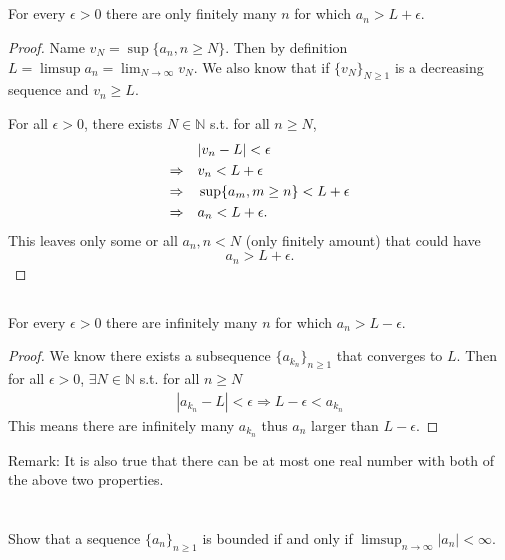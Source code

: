 \documentclass[11pt,letterpaper]{article}
\begin{document}
\subsection{} \label{sec:4a}
For every $\epsilon > 0$ there are only finitely many $n$ for which $a_n>L+\epsilon$.

\begin{proof}
Name $v_N = \sup\{a_n, n\geq N\}$. Then by definition $L = \limsup a_n = \lim_{N\rightarrow \infty}v_N$. We also know that if $\{v_N\}_{N\geq 1}$ is a decreasing sequence and $v_n\geq L$.

For all $\epsilon>0$, there exists $N\in \mathbb{N}$ s.t. for all $n\geq N$, 
\begin{align*}
    &|v_n-L|<\epsilon \\
    \Rightarrow \quad &v_n<L+\epsilon\\
    \Rightarrow \quad &\sup\{a_m, m\geq n\}<L+\epsilon\\
    \Rightarrow \quad &a_n<L+\epsilon.
\end{align*}
This leaves only some or all $a_n, n<N$ (only finitely amount) that could have
$$a_n>L+\epsilon.$$
\end{proof}

\subsection{} For every $\epsilon > 0$ there are infinitely many $n$ for which $a_n>L-\epsilon$.
\begin{proof}
We know there exists a subsequence $\{a_{k_n}\}_{n\geq 1}$ that converges to $L$. Then for all $\epsilon>0$, $\exists N\in\mathbb{N}$ s.t. for all $n\geq N$
\begin{align*}
    |a_{k_n}-L|<\epsilon \Rightarrow L-\epsilon<a_{k_n}
\end{align*}
This means there are infinitely many $a_{k_n}$ thus $a_{n}$ larger than $L-\epsilon$.
\end{proof}

Remark: It is also true that there can be at most one real number with both of the above two properties.

\section{}
Show that a sequence $\{a_n\}_{n\geq 1}$ is bounded if and only if $\limsup_{n\to\infty} |a_n|<\infty$.
\end{document}
